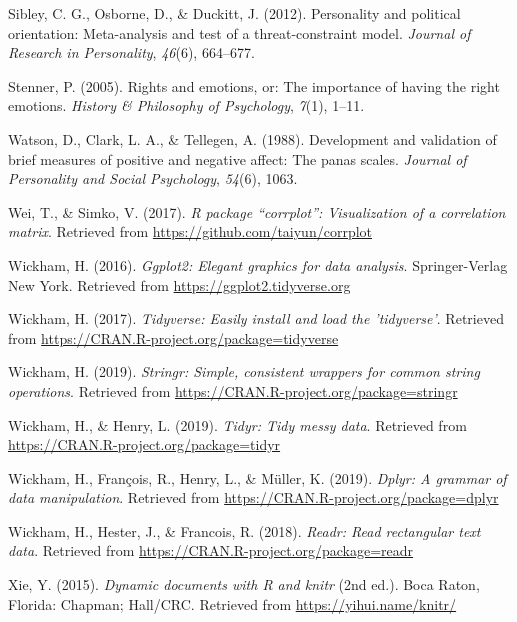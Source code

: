 \documentclass[man]{apa6}
\begin{document}
\hypertarget{ref-sibley2012personality}{}
Sibley, C. G., Osborne, D., \& Duckitt, J. (2012). Personality and
political orientation: Meta-analysis and test of a threat-constraint
model. \emph{Journal of Research in Personality}, \emph{46}(6),
664--677.

\hypertarget{ref-stenner2005rights}{}
Stenner, P. (2005). Rights and emotions, or: The importance of having
the right emotions. \emph{History \& Philosophy of Psychology},
\emph{7}(1), 1--11.

\hypertarget{ref-watson1988development}{}
Watson, D., Clark, L. A., \& Tellegen, A. (1988). Development and
validation of brief measures of positive and negative affect: The panas
scales. \emph{Journal of Personality and Social Psychology},
\emph{54}(6), 1063.

\hypertarget{ref-R-corrplot2017}{}
Wei, T., \& Simko, V. (2017). \emph{R package ``corrplot'':
Visualization of a correlation matrix}. Retrieved from
\url{https://github.com/taiyun/corrplot}

\hypertarget{ref-R-ggplot2}{}
Wickham, H. (2016). \emph{Ggplot2: Elegant graphics for data analysis}.
Springer-Verlag New York. Retrieved from
\url{https://ggplot2.tidyverse.org}

\hypertarget{ref-R-tidyverse}{}
Wickham, H. (2017). \emph{Tidyverse: Easily install and load the
'tidyverse'}. Retrieved from
\url{https://CRAN.R-project.org/package=tidyverse}

\hypertarget{ref-R-stringr}{}
Wickham, H. (2019). \emph{Stringr: Simple, consistent wrappers for
common string operations}. Retrieved from
\url{https://CRAN.R-project.org/package=stringr}

\hypertarget{ref-R-tidyr}{}
Wickham, H., \& Henry, L. (2019). \emph{Tidyr: Tidy messy data}.
Retrieved from \url{https://CRAN.R-project.org/package=tidyr}

\hypertarget{ref-R-dplyr}{}
Wickham, H., François, R., Henry, L., \& Müller, K. (2019). \emph{Dplyr:
A grammar of data manipulation}. Retrieved from
\url{https://CRAN.R-project.org/package=dplyr}

\hypertarget{ref-R-readr}{}
Wickham, H., Hester, J., \& Francois, R. (2018). \emph{Readr: Read
rectangular text data}. Retrieved from
\url{https://CRAN.R-project.org/package=readr}

\hypertarget{ref-R-knitr}{}
Xie, Y. (2015). \emph{Dynamic documents with R and knitr} (2nd ed.).
Boca Raton, Florida: Chapman; Hall/CRC. Retrieved from
\url{https://yihui.name/knitr/}
\end{document}
